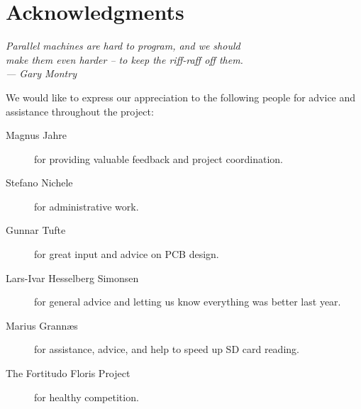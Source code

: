 
\bigskip

\begingroup
\let\clearpage\relax
\let\cleardoublepage\relax
\let\cleardoublepage\relax
\chapter*{Acknowledgments}
\begin{flushright}{\slshape
    Parallel machines are hard to program, and we should\\
    make them even harder -- to keep the riff-raff off them.\\ \medskip
    ---  Gary Montry}  %
\end{flushright}
\bigskip

We would like to express our appreciation to the following people for
advice and assistance throughout the project:

\begin{description} %
\item[Magnus Jahre] for providing valuable feedback and project coordination.
\item[Stefano Nichele] for administrative work.
\item[Gunnar Tufte] for great input and advice on PCB design.
\item[Lars-Ivar Hesselberg Simonsen] for general advice and letting us know
  everything was better last year.
\item[Marius Grann{\ae}s] for assistance, advice, and help to speed up SD
  card reading.
\item[The Fortitudo Floris Project] for healthy competition.
\end{description}
\endgroup
